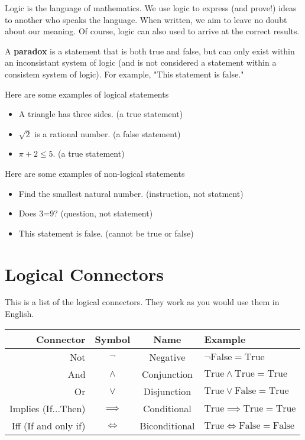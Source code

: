 Logic is the language of mathematics. We use logic to express (and prove!) ideas to another who speaks the language. When written, we aim to leave no doubt about our meaning. Of course, logic can also used to arrive at the correct results.

\begin{boxremark*}{}{}
	A {\bf paradox} is a statement that is both true and false, but can only exist within an inconsistant system of logic (and is not considered a statement within a consistem system of logic). For example, "This statement is false."
\end{boxremark*}

\begin{boxexample}{}{}
	Here are some examples of logical statements
	\begin{itemize}
		\item A triangle has three sides. (a true statement)
		\item $\sqrt 2$ is a rational number. (a false statement)
		\item $\pi + 2 \leq 5$. (a true statement)
	\end{itemize}
\end{boxexample}

\begin{boxexample}{}{}
	Here are some examples of non-logical statements
	\begin{itemize}
		\item Find the smallest natural number. (instruction, not statment)
		\item Does 3=9? (question, not statement)
		\item This statement is false. (cannot be true or false)
	\end{itemize}
\end{boxexample}

\section{Logical Connectors}

This is a list of the logical connectors. They work as you would use them in English.

\medskip
\begin{tabular}{r|c|c|l}
	\hline
	Connector & Symbol & Name & Example\\
	\hline
	Not & $\neg$ & Negative & $\neg \text{False} = \text{True}$\\
	And & $\land$ & Conjunction & $\text{True} \land \text{True} = \text{True} $\\
	Or & $\lor$ & Disjunction & $\text{True} \lor \text{False} = \text{True}$\\
	Implies (If...Then) & $\implies$ & Conditional & $\text{True} \implies \text{True} = \text{True}$\\
	Iff (If and only if) & $\iff$ & Biconditional & $\text{True} \iff \text{False} = \text{False}$\\
\hline
\end{tabular}
\medskip

